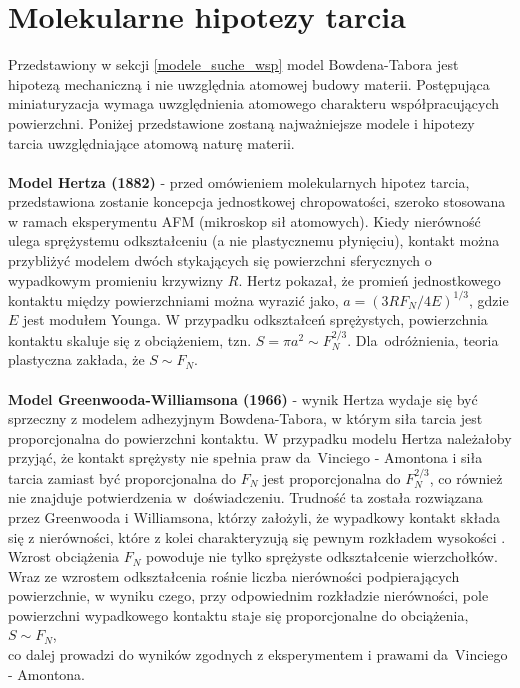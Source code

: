 \documentclass[12pt,a4paper,openright]{report} %
\begin{document}
\section{Molekularne hipotezy tarcia}
\label{mol_hip_tar}
Przedstawiony w sekcji \ref{modele_suche_wsp} model Bowdena-Tabora jest hipotezą mechaniczną i nie uwzględnia atomowej budowy materii. Postępująca miniaturyzacja wymaga uwzględnienia atomowego charakteru współpracujących powierzchni. Poniżej przedstawione zostaną najważniejsze modele i hipotezy tarcia uwzględniające atomową naturę materii. \\
\\
\textbf{Model Hertza (1882)} - 
przed omówieniem molekularnych hipotez tarcia, przedstawiona zostanie koncepcja jednostkowej chropowatości, szeroko stosowana w ramach eksperymentu AFM (mikroskop sił atomowych). Kiedy nierówność ulega sprężystemu odkształceniu (a nie plastycznemu płynięciu), kontakt można przybliżyć modelem dwóch stykających się powierzchni sferycznych o wypadkowym promieniu krzywizny $R$. \linebreak Hertz pokazał, że promień jednostkowego kontaktu między powierzchniami można wyrazić jako, $a=(3R F_N / 4E)^{1/3}$, gdzie $E$ jest modułem Younga. W przypadku odkształceń sprężystych, powierzchnia kontaktu skaluje się z obciążeniem, tzn. $S=\pi a^2 \sim F_N^{2/3}$. Dla~odróżnienia, teoria plastyczna zakłada, że $S \sim F_N$.\\
\\
\textbf{Model Greenwooda-Williamsona (1966)} - wynik Hertza wydaje się być sprzeczny z modelem adhezyjnym Bowdena-Tabora, w którym siła tarcia jest proporcjonalna do powierzchni kontaktu. W przypadku modelu Hertza należałoby przyjąć, że kontakt sprężysty nie spełnia praw da~Vinciego - Amontona i siła tarcia zamiast być proporcjonalna do $F_N$ jest proporcjonalna do $F_N^{2/3}$, co również nie znajduje potwierdzenia w~doświadczeniu. Trudność ta została rozwiązana przez Greenwooda i Williamsona, którzy założyli, że wypadkowy kontakt składa się z nierówności, które z kolei charakteryzują się pewnym rozkładem wysokości \cite{Borys, GreenWood}. Wzrost obciążenia $F_N$ powoduje nie tylko sprężyste odkształcenie wierzchołków. Wraz ze wzrostem odkształcenia rośnie liczba nierówności podpierających powierzchnie, w wyniku czego, przy odpowiednim rozkładzie nierówności, pole powierzchni wypadkowego kontaktu staje się proporcjonalne do obciążenia, $S \sim F_N$, \linebreak 
\\
co dalej prowadzi do wyników zgodnych z eksperymentem i prawami da~Vinciego - Amontona.
\end{document}
